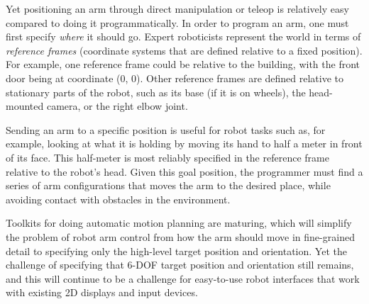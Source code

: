 \documentclass[11pt,twocolumn]{article}
\begin{document}

Yet positioning an arm through direct manipulation or teleop is relatively easy compared to doing it programmatically. In order to program an arm, one must first specify {\em where} it should go.  Expert roboticists represent the world in terms of {\em reference frames} (coordinate systems that are defined relative to a fixed position). For example, one reference frame could be relative to the building, with the front door being at coordinate (0, 0).  Other reference frames are defined relative to stationary parts of the robot, such as its base (if it is on wheels), the head-mounted camera, or the right elbow joint.

Sending an arm to a specific position is useful for robot tasks such as, for example, looking at what it is holding by moving its hand to half a meter in front of its face. This half-meter is most reliably specified in the reference frame relative to the robot's head. Given this goal position, the programmer must find a series of arm configurations that moves the arm to the desired place, while avoiding contact with obstacles in the environment.


Toolkits for doing automatic motion planning are maturing, which will simplify the problem of robot arm control from how the arm should move in fine-grained detail to specifying only the high-level target position and orientation. Yet the challenge of specifying that 6-DOF target position and orientation still remains, and this will continue to be a challenge for easy-to-use robot interfaces that work with existing 2D displays and input devices.
\end{document}
